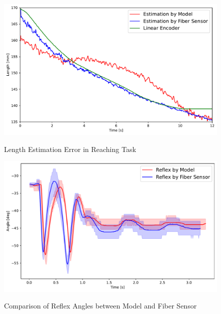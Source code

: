 \begin{figure}[t]
    \centering
    \begin{minipage}[H]{\textwidth} %
        \begin{minipage}[H]{0.48\textwidth} %
            \centering
            \includegraphics[width=\columnwidth]{fig/reaching_error.pdf}
            \caption{Length Estimation Error in Reaching Task}
            \label{fig:reaching_error}
            \vspace{1em}
            \includegraphics[width=\columnwidth]{fig/time_vs_angle_model_sensor.pdf}
            \caption{Comparison of Reflex Angles between Model and Fiber Sensor }
            \label{fig:reflex_angle}
        \end{minipage}
        \hfill
        \begin{minipage}[H]{0.48\textwidth} %
            \centering

\end{minipage}
\end{minipage}
\end{figure}
